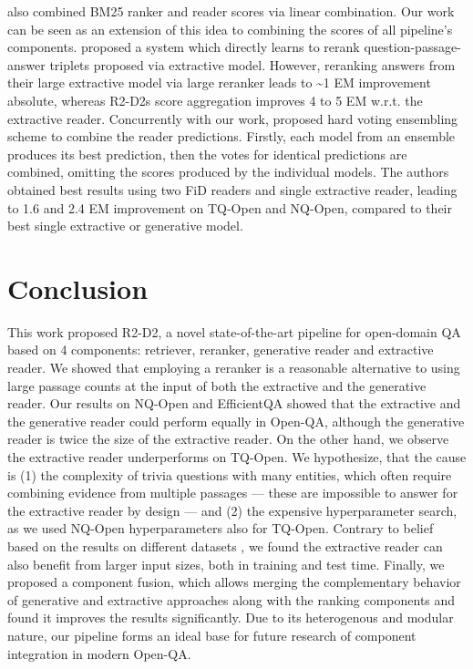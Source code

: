 \documentclass[11pt]{article}
\begin{document}
\begin{description}[style=unboxed,leftmargin=0em,listparindent=\parindent,parsep=0pt,]
\item[Component Fusion.]
 \citet{yang-etal-2019-end} also combined BM25 ranker and reader scores via linear combination. Our work can be seen as an extension of this idea to combining the scores of all pipeline's components.
\citet{iyerreconsider2020} proposed a system which directly learns to rerank question-passage-answer triplets proposed via extractive model. However, reranking answers from their large extractive model via large reranker leads to \textasciitilde1 EM improvement absolute, whereas R2-D2s score aggregation improves 4 to 5 EM w.r.t. the extractive reader. Concurrently with our work, \citet{cheng2021unitedqa} proposed hard voting ensembling scheme to combine the reader predictions. Firstly, each model from an ensemble produces its best prediction, then the votes for identical predictions are combined, omitting the scores produced by the individual models. The authors obtained best results using two FiD readers and single extractive reader, leading to 1.6 and 2.4 EM improvement on TQ-Open and NQ-Open, compared to their best single extractive or generative model.
 
\end{description}

\section{Conclusion}
This work proposed R2-D2, a novel state-of-the-art pipeline for open-domain QA based on 4 components: retriever, reranker, generative reader and extractive reader. 
We showed that employing a reranker is a reasonable alternative to using large passage counts at the input of both the extractive and the generative reader. 
Our results on NQ-Open and EfficientQA showed that the extractive and the generative reader could perform equally in Open-QA, although the generative reader is twice the size of the extractive reader. 
On the other hand, we observe the extractive reader underperforms on TQ-Open. We hypothesize, that the cause is (1) the complexity of trivia questions with many entities, which often require combining evidence from multiple passages --- these are impossible to answer for the extractive reader by design --- and (2) the expensive hyperparameter search, as we used NQ-Open hyperparameters also for TQ-Open.
Contrary to belief based on the results on different datasets \cite{yang-etal-2019-end,wang-etal-2019-multi,izacard2020leveraging}, we found the extractive reader can also benefit from larger input sizes, both in training and test time. 
Finally, we proposed a component fusion, which allows merging the complementary behavior of generative and extractive approaches along with the ranking components and found it improves the results significantly. 
Due to its heterogenous and modular nature, our pipeline forms an ideal base for future research of component integration in modern Open-QA. 
\end{document}

